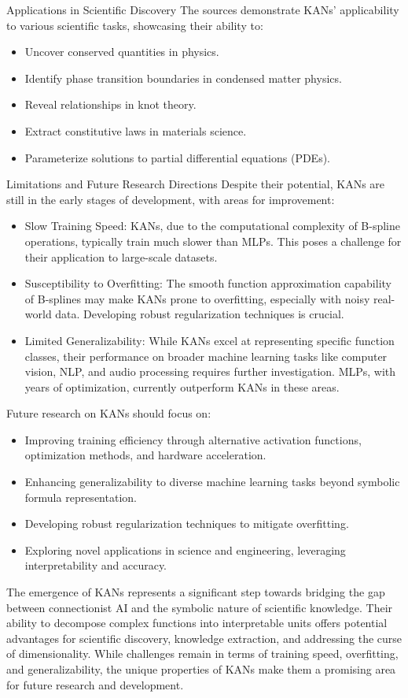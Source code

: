     Applications in Scientific Discovery
    The sources demonstrate KANs' applicability to various scientific tasks, showcasing their ability to:
\begin{itemize}
    \item Uncover conserved quantities in physics.
    \item Identify phase transition boundaries in condensed matter physics.
    \item Reveal relationships in knot theory.
    \item Extract constitutive laws in materials science.
    \item Parameterize solutions to partial differential equations (PDEs).
\end{itemize}

Limitations and Future Research Directions
Despite their potential, KANs are still in the early stages of development, with areas for improvement:
\begin{itemize}
    \item Slow Training Speed: KANs, due to the computational complexity of B-spline operations, typically train much slower than MLPs. This poses a challenge for their application to large-scale datasets.
    \item Susceptibility to Overfitting: The smooth function approximation capability of B-splines may make KANs prone to overfitting, especially with noisy real-world data. Developing robust regularization techniques is crucial.
    \item Limited Generalizability: While KANs excel at representing specific function classes, their performance on broader machine learning tasks like computer vision, NLP, and audio processing requires further investigation. MLPs, with years of optimization, currently outperform KANs in these areas.
\end{itemize}

Future research on KANs should focus on:
\begin{itemize}
    \item Improving training efficiency through alternative activation functions, optimization methods, and hardware acceleration.
    \item Enhancing generalizability to diverse machine learning tasks beyond symbolic formula representation.
    \item Developing robust regularization techniques to mitigate overfitting.
    \item Exploring novel applications in science and engineering, leveraging interpretability and accuracy.
\end{itemize}


The emergence of KANs represents a significant step towards bridging the gap between connectionist AI and the symbolic nature of scientific knowledge. Their ability to decompose complex functions into interpretable units offers potential advantages for scientific discovery, knowledge extraction, and addressing the curse of dimensionality. While challenges remain in terms of training speed, overfitting, and generalizability, the unique properties of KANs make them a promising area for future research and development.

